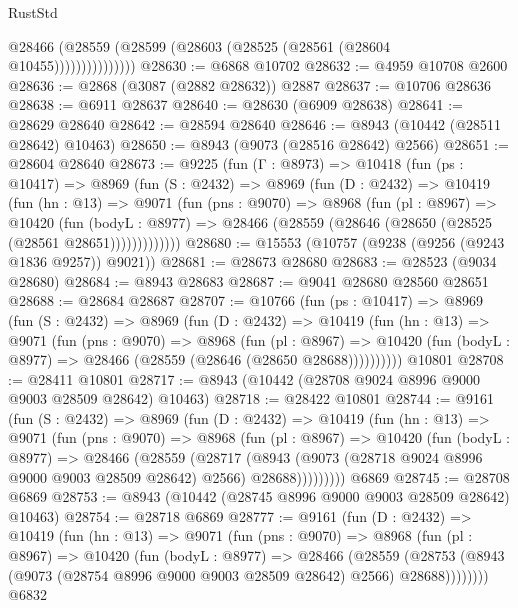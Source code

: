 \begin{lexlean}{RustStd}
\begin{coremodule}
                    @28466 (@28559 (@28599 (@28603 (@28525 (@28561 (@28604 @10455)))))))))))))))
@28630 := @6868 @10702
@28632 := @4959 @10708 @2600
@28636 := @2868 (@3087 (@2882 @28632)) @2887
@28637 := @10706 @28636
@28638 := @6911 @28637
@28640 := @28630 (@6909 @28638)
@28641 := @28629 @28640
@28642 := @28594 @28640
@28646 := @8943 (@10442 (@28511 @28642) @10463)
@28650 := @8943 (@9073 (@28516 @28642) @2566)
@28651 := @28604 @28640
@28673 := @9225
    (fun (Γ : @8973) =>
    @10418
      (fun (ps : @10417) =>
      @8969
        (fun (S : @2432) =>
        @8969
          (fun (D : @2432) =>
          @10419
            (fun (hn : @13) =>
            @9071
              (fun (pns : @9070) =>
              @8968
                (fun (pl : @8967) =>
                @10420
                  (fun (bodyL : @8977) =>
                  @28466 (@28559 (@28646 (@28650 (@28525 (@28561 @28651)))))))))))))
@28680 := @15553 (@10757 (@9238 (@9256 (@9243 @1836 @9257)) @9021))
@28681 := @28673 @28680
@28683 := @28523 (@9034 @28680)
@28684 := @8943 @28683
@28687 := @9041 @28680 @28560 @28651
@28688 := @28684 @28687
@28707 := @10766
    (fun (ps : @10417) =>
    @8969
      (fun (S : @2432) =>
      @8969
        (fun (D : @2432) =>
        @10419
          (fun (hn : @13) =>
          @9071
            (fun (pns : @9070) =>
            @8968
              (fun (pl : @8967) =>
              @10420 (fun (bodyL : @8977) => @28466 (@28559 (@28646 (@28650 @28688))))))))))
    @10801
@28708 := @28411 @10801
@28717 := @8943 (@10442 (@28708 @9024 @8996 @9000 @9003 @28509 @28642) @10463)
@28718 := @28422 @10801
@28744 := @9161
    (fun (S : @2432) =>
    @8969
      (fun (D : @2432) =>
      @10419
        (fun (hn : @13) =>
        @9071
          (fun (pns : @9070) =>
          @8968
            (fun (pl : @8967) =>
            @10420
              (fun (bodyL : @8977) =>
              @28466
                (@28559
                  (@28717
                    (@8943
                      (@9073 (@28718 @9024 @8996 @9000 @9003 @28509 @28642) @2566)
                      @28688)))))))))
    @6869
@28745 := @28708 @6869
@28753 := @8943 (@10442 (@28745 @8996 @9000 @9003 @28509 @28642) @10463)
@28754 := @28718 @6869
@28777 := @9161
    (fun (D : @2432) =>
    @10419
      (fun (hn : @13) =>
      @9071
        (fun (pns : @9070) =>
        @8968
          (fun (pl : @8967) =>
          @10420
            (fun (bodyL : @8977) =>
            @28466
              (@28559
                (@28753 (@8943 (@9073 (@28754 @8996 @9000 @9003 @28509 @28642) @2566) @28688))))))))
    @6832

\end{coremodule}
\end{lexlean}
